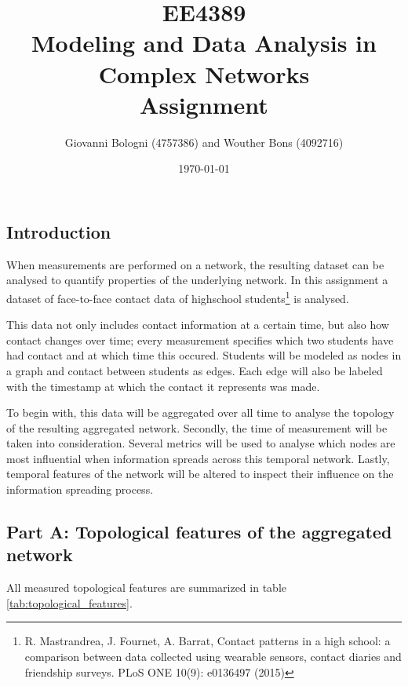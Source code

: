 \documentclass[letterpaper]{article}
\author{Giovanni Bologni (4757386) and Wouther Bons (4092716)}
\date{\today}
\title{EE4389\\Modeling and Data Analysis in Complex Networks\\Assignment}
\begin{document}
\maketitle

\subsection*{Introduction}
When measurements are performed on a network, the resulting dataset can be analysed to quantify properties of the underlying network. In this assignment a dataset of face-to-face contact data of highschool students\footnote{R. Mastrandrea, J. Fournet, A. Barrat, Contact patterns in a high school: a comparison between data collected using wearable sensors, contact diaries and friendship surveys. PLoS ONE 10(9): e0136497 (2015)} is analysed.

This data not only includes contact information at a certain time, but also how contact changes over time; every measurement specifies which two students have had contact and at which time this occured. Students will be modeled as nodes in a graph and contact between students as edges. Each edge will also be labeled with the timestamp at which the contact it represents was made.

To begin with, this data will be aggregated over all time to analyse the topology of the resulting aggregated network. Secondly, the time of measurement will be taken into consideration. Several metrics will be used to analyse which nodes are most influential when information spreads across this temporal network. Lastly, temporal features of the network will be altered to inspect their influence on the information spreading process.

\subsection*{Part A: Topological features of the aggregated network}
\label{sec:partA}

All measured topological features are summarized in table \ref{tab:topological_features}.
\end{document}
